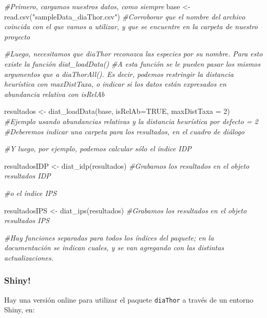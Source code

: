 \documentclass[
]{book}
\newenvironment{Shaded}{\begin{snugshade}}{\end{snugshade}}
\newcommand{\AttributeTok}[1]{\textcolor[rgb]{0.77,0.63,0.00}{#1}}
\newcommand{\CommentTok}[1]{\textcolor[rgb]{0.56,0.35,0.01}{\textit{#1}}}
\newcommand{\ConstantTok}[1]{\textcolor[rgb]{0.00,0.00,0.00}{#1}}
\newcommand{\DecValTok}[1]{\textcolor[rgb]{0.00,0.00,0.81}{#1}}
\newcommand{\FunctionTok}[1]{\textcolor[rgb]{0.00,0.00,0.00}{#1}}
\newcommand{\NormalTok}[1]{#1}
\newcommand{\OtherTok}[1]{\textcolor[rgb]{0.56,0.35,0.01}{#1}}
\newcommand{\StringTok}[1]{\textcolor[rgb]{0.31,0.60,0.02}{#1}}
\begin{document}
\begin{Shaded}
\begin{Highlighting}[]
\CommentTok{\#Primero, cargamos nuestros datos, como siempre}
\NormalTok{base }\OtherTok{\textless{}{-}} \FunctionTok{read.csv}\NormalTok{(}\StringTok{"sampleData\_diaThor.csv"}\NormalTok{) }\CommentTok{\#Corroborar que el nombre del archivo coincida con el que vamos a utilizar, y que se encuentre en la carpeta de nuestro proyecto}

\CommentTok{\#Luego, necesitamos que diaThor reconozca las especies por su nombre. Para esto existe la función diat\_loadData()}
\CommentTok{\#A esta función se le pueden pasar los mismos argumentos que a diaThorAll(). Es decir, podemos restringir la distancia heurística con \textquotesingle{}maxDistTaxa\textquotesingle{}, o indicar si los datos están expresados en abundancia relativa con \textquotesingle{}isRelAb\textquotesingle{}}

\NormalTok{resultados }\OtherTok{\textless{}{-}} \FunctionTok{diat\_loadData}\NormalTok{(base, }\AttributeTok{isRelAb=}\ConstantTok{TRUE}\NormalTok{, }\AttributeTok{maxDistTaxa =} \DecValTok{2}\NormalTok{) }\CommentTok{\#Ejemplo usando abundancias relativas y la distancia heurística por defecto = 2}
\CommentTok{\#Deberemos indicar una carpeta para los resultados, en el cuadro de diálogo }

\CommentTok{\#Y luego, por ejemplo, podemos calcular sólo el índice IDP}

\NormalTok{resultadosIDP }\OtherTok{\textless{}{-}} \FunctionTok{diat\_idp}\NormalTok{(resultados) }\CommentTok{\#Grabamos los resultados en el objeto resultados IDP}

\CommentTok{\#o el índice IPS}

\NormalTok{resultadosIPS }\OtherTok{\textless{}{-}} \FunctionTok{diat\_ips}\NormalTok{(resultados) }\CommentTok{\#Grabamos los resultados en el objeto resultados IPS}

\CommentTok{\#Hay funciones separadas para todos los índices del paquete; en la documentación se indican cuales, y se van agregando con las distintas actualizaciones.}
\end{Highlighting}
\end{Shaded}

\hypertarget{shiny}{%
\subsubsection{Shiny!}\label{shiny}}

Hay una versión online para utilizar el paquete \texttt{diaThor} a través de un entorno Shiny, en:
\end{document}
